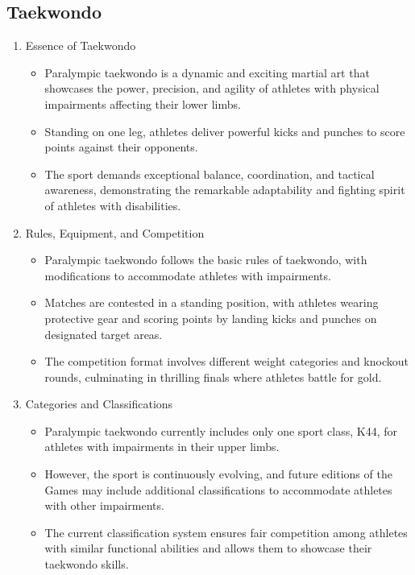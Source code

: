 \subsection{Taekwondo}

\begin{enumerate}
\item Essence of Taekwondo
    \begin{itemize}
    \item Paralympic taekwondo is a dynamic and exciting martial art that showcases the power, precision, and agility of athletes with physical impairments affecting their lower limbs. 
    \item Standing on one leg, athletes deliver powerful kicks and punches to score points against their opponents. 
    \item The sport demands exceptional balance, coordination, and tactical awareness, demonstrating the remarkable adaptability and fighting spirit of athletes with disabilities.
    \end{itemize}

\item Rules, Equipment, and Competition
    \begin{itemize}
    \item Paralympic taekwondo follows the basic rules of taekwondo, with modifications to accommodate athletes with impairments. 
    \item Matches are contested in a standing position, with athletes wearing protective gear and scoring points by landing kicks and punches on designated target areas. 
    \item The competition format involves different weight categories and knockout rounds, culminating in thrilling finals where athletes battle for gold.
    \end{itemize}

\item Categories and Classifications
    \begin{itemize}
    \item Paralympic taekwondo currently includes only one sport class, K44, for athletes with impairments in their upper limbs. 
    \item However, the sport is continuously evolving, and future editions of the Games may include additional classifications to accommodate athletes with other impairments. 
    \item The current classification system ensures fair competition among athletes with similar functional abilities and allows them to showcase their taekwondo skills.
    \end{itemize}

\end{enumerate}